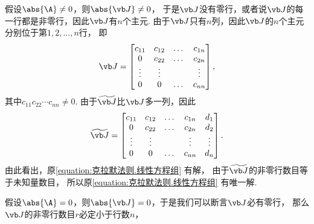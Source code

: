 假设\(\abs{\A}\neq0\)，则\(\abs{\J}\neq0\)，
于是\(\J\)没有零行，或者说\(\J\)的每一行都是非零行，因此\(\J\)有\(n\)个主元.
由于\(\J\)只有\(n\)列，因此\(\J\)的\(n\)个主元分别位于第\(1,2,\dotsc,n\)行，
即\[
	\J = \begin{bmatrix}
		c_{11} & c_{12} & \dots & c_{1n} \\
		0 & c_{22} & \dots & c_{2n} \\
		\vdots & \vdots & & \vdots \\
		0 & 0 & \dots & c_{nn}
	\end{bmatrix},
\]
其中\(c_{11} c_{22} \dotsm c_{nn} \neq 0\).
由于\(\wJ\)比\(\J\)多一列，因此\[
	\wJ = \begin{bmatrix}
		c_{11} & c_{12} & \dots & c_{1n} & d_1 \\
		0 & c_{22} & \dots & c_{2n} & d_2 \\
		\vdots & \vdots & & \vdots & \vdots \\
		0 & 0 & \dots & c_{nn} & d_n
	\end{bmatrix}.
\]
由此看出，原\cref{equation:克拉默法则.线性方程组} 有解，
由于\(\wJ\)的非零行数目等于未知量数目，
所以原\cref{equation:克拉默法则.线性方程组} 有唯一解.

假设\(\abs{\A}=0\)，则\(\abs{\J}=0\)，于是我们可以断言\(\J\)必有零行，
那么\(\J\)的非零行数目\(r\)必定小于行数\(n\)，
\endgroup


